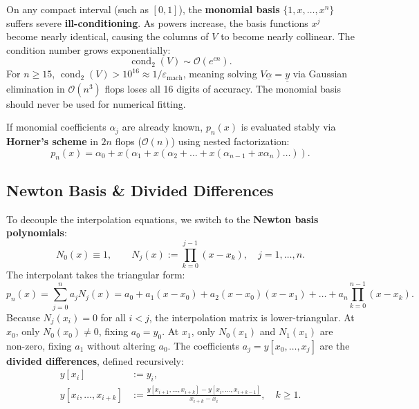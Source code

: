 \begin{important}
    On any compact interval (such as $[0, 1]$), the \textbf{monomial basis} $\{1, x, \dots, x^n\}$ suffers severe \textbf{ill-conditioning}. As powers increase, the basis functions $x^j$ become nearly identical, causing the columns of $V$ to become nearly collinear. The condition number grows exponentially:
    \begin{equation}
        \operatorname{cond}_2(V) \sim \mathcal{O}(e^{c n}).
    \end{equation}
    For $n \ge 15$, $\operatorname{cond}_2(V) > 10^{16} \approx 1/\varepsilon_{\text{mach}}$, meaning solving $V \underline{\alpha} = \underline{y}$ via Gaussian elimination in $\mathcal{O}(n^3)$ flops loses all 16 digits of accuracy. The monomial basis should never be used for numerical fitting.
\end{important}

If monomial coefficients $\alpha_j$ are already known, $p_n(x)$ is evaluated stably via \textbf{Horner's scheme} in $2n$ flops ($\mathcal{O}(n)$) using nested factorization:
\begin{equation}
    p_n(x) = \alpha_0 + x \left(\alpha_1 + x \left(\alpha_2 + \dots + x(\alpha_{n-1} + x \alpha_n)\dots\right)\right).
\end{equation}

\subsection{Newton Basis \& Divided Differences}

To decouple the interpolation equations, we switch to the \textbf{Newton basis polynomials}:
\begin{equation}
    N_0(x) \equiv 1, \qquad N_j(x) := \prod_{k=0}^{j-1} (x - x_k), \quad j = 1, \dots, n.
\end{equation}
The interpolant takes the triangular form:
\begin{equation}
    p_n(x) = \sum_{j=0}^{n} a_j N_j(x) = a_0 + a_1(x - x_0) + a_2(x - x_0)(x - x_1) + \dots + a_n \prod_{k=0}^{n-1}(x - x_k).
\end{equation}
Because $N_j(x_i) = 0$ for all $i < j$, the interpolation matrix is lower-triangular. At $x_0$, only $N_0(x_0) \neq 0$, fixing $a_0 = y_0$. At $x_1$, only $N_0(x_1)$ and $N_1(x_1)$ are non-zero, fixing $a_1$ without altering $a_0$. The coefficients $a_j = y[x_0, \dots, x_j]$ are the \textbf{divided differences}, defined recursively:
\begin{align}
    y[x_i] &:= y_i, \\
    y[x_i, \dots, x_{i+k}] &:= \frac{y[x_{i+1}, \dots, x_{i+k}] - y[x_i, \dots, x_{i+k-1}]}{x_{i+k} - x_i}, \quad k \ge 1.
\end{align}


